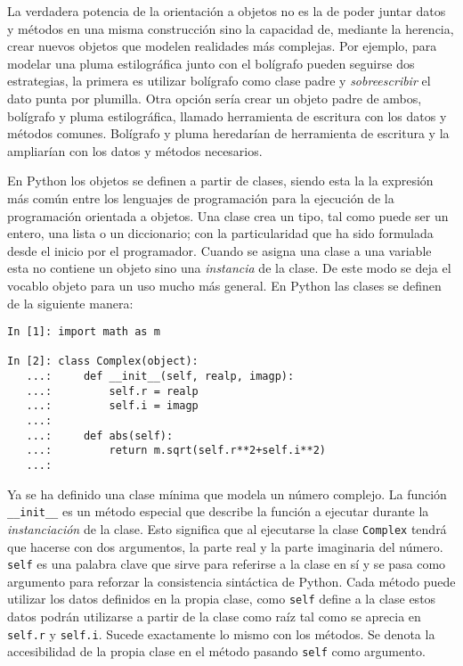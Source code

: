 \documentclass[a4paper,10pt]{article}
\begin{document}
La verdadera potencia de la orientación a objetos no es la de poder
juntar datos y métodos en una misma construcción sino la capacidad de,
mediante la herencia, crear nuevos objetos que modelen realidades más
complejas.  Por ejemplo, para modelar una pluma estilográfica junto
con el bolígrafo pueden seguirse dos estrategias, la primera es
utilizar bolígrafo como clase padre y \emph{sobreescribir} el dato
punta por plumilla.  Otra opción sería crear un objeto padre de ambos,
bolígrafo y pluma estilográfica, llamado herramienta de escritura con
los datos y métodos comunes.  Bolígrafo y pluma heredarían de
herramienta de escritura y la ampliarían con los datos y métodos
necesarios.

En Python los objetos se definen a partir de clases, siendo esta la
la expresión más común entre los lenguajes de programación para la
ejecución de la programación orientada a objetos.  Una clase crea un
tipo, tal como puede ser un entero, una lista o un diccionario; con la
particularidad que ha sido formulada desde el inicio por el
programador.  Cuando se asigna una clase a una variable esta no
contiene un objeto sino una \emph{instancia} de la clase.  De este
modo se deja el vocablo objeto para un uso mucho más general.  En
Python las clases se definen de la siguiente manera:

\begin{lstlisting}
In [1]: import math as m

In [2]: class Complex(object):
   ...:     def __init__(self, realp, imagp):
   ...:         self.r = realp
   ...:         self.i = imagp
   ...:
   ...:     def abs(self):
   ...:         return m.sqrt(self.r**2+self.i**2)
   ...:
\end{lstlisting}

Ya se ha definido una clase mínima que modela un número complejo.  La
función \texttt{\_\_init\_\_} es un método especial que describe la
función a ejecutar durante la \emph{instanciación} de la clase.  Esto
significa que al ejecutarse la clase \texttt{Complex} tendrá que
hacerse con dos argumentos, la parte real y la parte imaginaria del
número. \texttt{self} es una palabra clave que sirve para referirse a
la clase en sí y se pasa como argumento para reforzar la consistencia
sintáctica de Python.  Cada método puede utilizar los datos definidos
en la propia clase, como \texttt{self} define a la clase estos datos
podrán utilizarse a partir de la clase como raíz tal como se aprecia
en \texttt{self.r} y \texttt{self.i}.  Sucede exactamente lo mismo con
los métodos. Se denota la accesibilidad de la propia clase en el
método pasando \texttt{self} como argumento.
\end{document}
